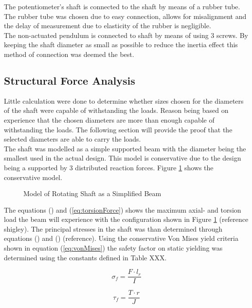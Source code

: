The potentiometer's shaft is connected to the shaft by means of a rubber tube. The rubber tube was chosen due to easy connection, allows for misalignment and the delay of measurement due to elasticity of the rubber is negligible. \\

The non-actuated pendulum is connected to shaft by means of using 3 screws. By keeping the shaft diameter as small as possible to reduce the inertia effect this method of connection was deemed the best.

\subsection{Structural Force Analysis}
Little calculation were done to determine whether sizes chosen for the diameters of the shaft were capable of withstanding the loads. Reason being based on experience that the chosen diameters are more than enough capable of withstanding the loads. The following section will provide the proof that the selected diameters are able to carry the loads.\\

The shaft was modelled as a simple supported beam with the diameter being the smallest used in the actual design. This model is conservative due to the design being a supported by 3 distributed reaction forces. Figure \ref{fig:supp_beam} shows the conservative model.

\begin{figure}[h]
	\centering
	
	\caption{Model of Rotating Shaft as a Simplified Beam}
	\label{fig:supp_beam}
\end{figure}

The equations () and (\ref{eq:torsionForce}) shows the maximum axial- and torsion load the beam will experience with the configuration shown in Figure \ref{fig:supp_beam} (reference shigley). The principal stresses in the shaft was than determined through equations () and () (reference). Using the conservative Von Mises yield criteria shown in equation (\ref{eq:vonMises}) the safety factor on static yielding was determined using the constants defined in Table XXX.

\begin{equation} \label{eq:axialForce}
\sigma_{f} = \frac{F\cdot l_{r}}{I}
\end{equation}

\begin{equation} \label{eq:torsionForce}
\tau_{f} = \frac{T\cdot r}{J}
\end{equation}



